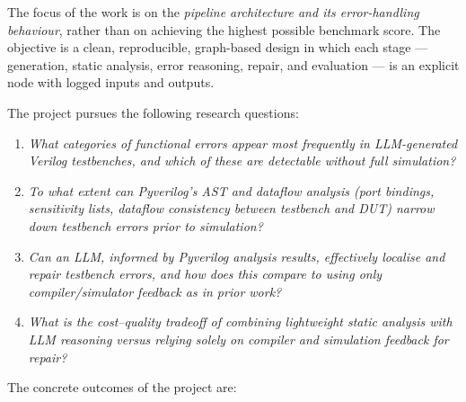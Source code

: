 \documentclass[11pt,a4paper, titlepage=false]{scrreprt}
\begin{document}
The focus of the work is on the \emph{pipeline architecture and its error-handling behaviour},
rather than on achieving the highest possible benchmark score. The objective is a clean,
reproducible, graph-based design in which each stage --- generation, static analysis, error
reasoning, repair, and evaluation --- is an explicit node with logged inputs and outputs.

\medskip
\noindent The project pursues the following research questions:

\begin{enumerate}[label=\textbf{RQ\arabic*.}, leftmargin=*, itemsep=4pt]

    \item \textit{What categories of functional errors appear most frequently in LLM-generated
    Verilog testbenches, and which of these are detectable without full simulation?}

    \item \textit{To what extent can Pyverilog's AST and dataflow analysis (port bindings,
    sensitivity lists, dataflow consistency between testbench and DUT) narrow down testbench
    errors prior to simulation?}

    \item \textit{Can an LLM, informed by Pyverilog analysis results, effectively localise and
    repair testbench errors, and how does this compare to using only compiler/simulator feedback
    as in prior work?}

    \item \textit{What is the cost--quality tradeoff of combining lightweight static analysis
    with LLM reasoning versus relying solely on compiler and simulation feedback for repair?}

\end{enumerate}

\medskip
\noindent The concrete outcomes of the project are:
\end{document}
